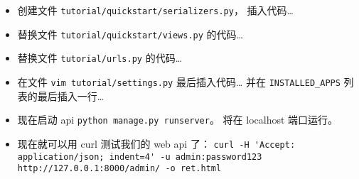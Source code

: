 \begin{itemize}
\item 创建文件 \verb|tutorial/quickstart/serializers.py|， 插入代码…
\item 替换文件 \verb|tutorial/quickstart/views.py| 的代码…
\item 替换文件 \verb|tutorial/urls.py| 的代码…
\item 在文件 \verb|vim tutorial/settings.py| 最后插入代码… 并在 \verb|INSTALLED_APPS| 列表的最后插入一行…
\item 现在启动 api \verb|python manage.py runserver|。 将在 localhost 端口运行。
\item 现在就可以用 curl 测试我们的 web api 了： \verb|curl -H 'Accept: application/json; indent=4' -u admin:password123 http://127.0.0.1:8000/admin/ -o ret.html|
\end{itemize}
